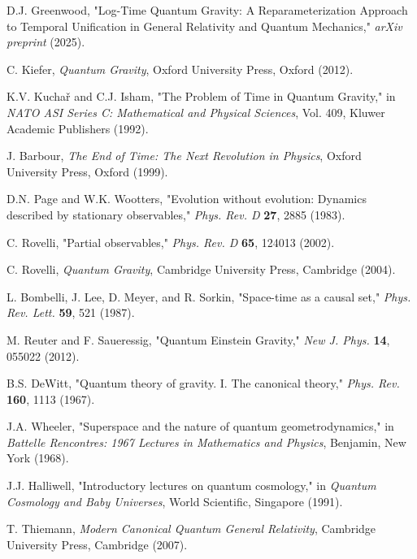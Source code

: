 \documentclass[12pt,a4paper]{article}
\begin{document}



\begin{thebibliography}{99}

D.J. Greenwood,
"Log-Time Quantum Gravity: A Reparameterization Approach to Temporal Unification in General Relativity and Quantum Mechanics,"
\emph{arXiv preprint} (2025).

C. Kiefer,
\emph{Quantum Gravity},
Oxford University Press, Oxford (2012).

K.V. Kuchař and C.J. Isham,
"The Problem of Time in Quantum Gravity,"
in \emph{NATO ASI Series C: Mathematical and Physical Sciences}, Vol. 409,
Kluwer Academic Publishers (1992).

J. Barbour,
\emph{The End of Time: The Next Revolution in Physics},
Oxford University Press, Oxford (1999).

D.N. Page and W.K. Wootters,
"Evolution without evolution: Dynamics described by stationary observables,"
\emph{Phys. Rev. D} \textbf{27}, 2885 (1983).

C. Rovelli,
"Partial observables,"
\emph{Phys. Rev. D} \textbf{65}, 124013 (2002).

C. Rovelli,
\emph{Quantum Gravity},
Cambridge University Press, Cambridge (2004).

L. Bombelli, J. Lee, D. Meyer, and R. Sorkin,
"Space-time as a causal set,"
\emph{Phys. Rev. Lett.} \textbf{59}, 521 (1987).

M. Reuter and F. Saueressig,
"Quantum Einstein Gravity,"
\emph{New J. Phys.} \textbf{14}, 055022 (2012).

B.S. DeWitt,
"Quantum theory of gravity. I. The canonical theory,"
\emph{Phys. Rev.} \textbf{160}, 1113 (1967).

J.A. Wheeler,
"Superspace and the nature of quantum geometrodynamics,"
in \emph{Battelle Rencontres: 1967 Lectures in Mathematics and Physics},
Benjamin, New York (1968).

J.J. Halliwell,
"Introductory lectures on quantum cosmology,"
in \emph{Quantum Cosmology and Baby Universes},
World Scientific, Singapore (1991).

T. Thiemann,
\emph{Modern Canonical Quantum General Relativity},
Cambridge University Press, Cambridge (2007).

\end{thebibliography}
\end{document}
